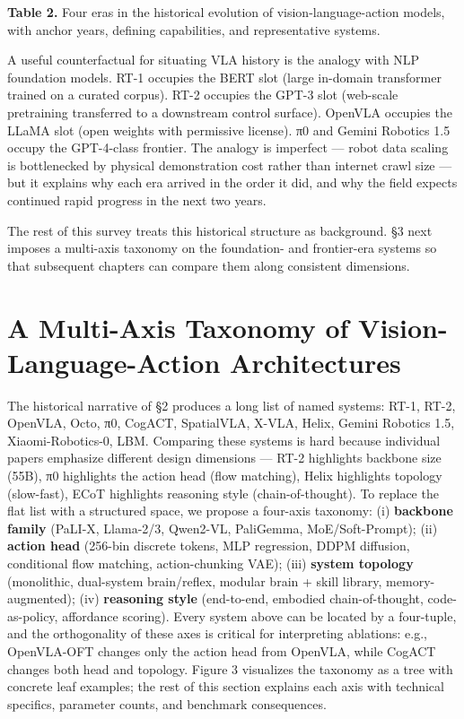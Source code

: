 \textbf{Table 2.} Four eras in the historical evolution of vision-language-action models, with anchor years, defining capabilities, and representative systems.

A useful counterfactual for situating VLA history is the analogy with NLP foundation models. RT-1 occupies the BERT slot (large in-domain transformer trained on a curated corpus). RT-2 occupies the GPT-3 slot (web-scale pretraining transferred to a downstream control surface). OpenVLA occupies the LLaMA slot (open weights with permissive license). π0 and Gemini Robotics 1.5 occupy the GPT-4-class frontier. The analogy is imperfect --- robot data scaling is bottlenecked by physical demonstration cost rather than internet crawl size --- but it explains why each era arrived in the order it did, and why the field expects continued rapid progress in the next two years.

The rest of this survey treats this historical structure as background. §3 next imposes a multi-axis taxonomy on the foundation- and frontier-era systems so that subsequent chapters can compare them along consistent dimensions.

\section{A Multi-Axis Taxonomy of Vision-Language-Action Architectures}\label{a-multi-axis-taxonomy-of-vision-language-action-architectures}

The historical narrative of §2 produces a long list of named systems: RT-1, RT-2, OpenVLA, Octo, π0, CogACT, SpatialVLA, X-VLA, Helix, Gemini Robotics 1.5, Xiaomi-Robotics-0, LBM. Comparing these systems is hard because individual papers emphasize different design dimensions --- RT-2 highlights backbone size (55B), π0 highlights the action head (flow matching), Helix highlights topology (slow-fast), ECoT highlights reasoning style (chain-of-thought). To replace the flat list with a structured space, we propose a four-axis taxonomy: (i) \textbf{backbone family} (PaLI-X, Llama-2/3, Qwen2-VL, PaliGemma, MoE/Soft-Prompt); (ii) \textbf{action head} (256-bin discrete tokens, MLP regression, DDPM diffusion, conditional flow matching, action-chunking VAE); (iii) \textbf{system topology} (monolithic, dual-system brain/reflex, modular brain + skill library, memory-augmented); (iv) \textbf{reasoning style} (end-to-end, embodied chain-of-thought, code-as-policy, affordance scoring). Every system above can be located by a four-tuple, and the orthogonality of these axes is critical for interpreting ablations: e.g., OpenVLA-OFT changes only the action head from OpenVLA, while CogACT changes both head and topology. Figure 3 visualizes the taxonomy as a tree with concrete leaf examples; the rest of this section explains each axis with technical specifics, parameter counts, and benchmark consequences.


